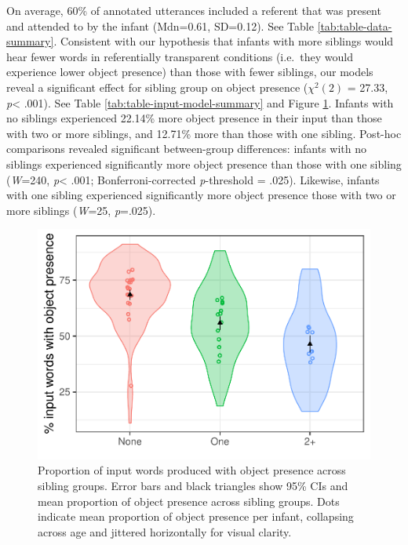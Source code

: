 \documentclass[
  man,mask,floatsintext]{apa6}
\begin{document}
On average, 60\% of annotated utterances included a referent that was present and attended to by the infant (Mdn=0.61, SD=0.12). See Table \ref{tab:table-data-summary}. Consistent with our hypothesis that infants with more siblings would hear fewer words in referentially transparent conditions (i.e.~they would experience lower object presence) than those with fewer siblings, our models reveal a significant effect for sibling group on object presence (\(\chi^2 (2)\) = 27.33, \emph{p}\textless{} .001). See Table \ref{tab:table-input-model-summary} and Figure \ref{fig:Figure-object-presence}. Infants with no siblings experienced 22.14\% more object presence in their input than those with two or more siblings, and 12.71\% more than those with one sibling. Post-hoc comparisons revealed significant between-group differences: infants with no siblings experienced significantly more object presence than those with one sibling (\emph{W}=240, \emph{p}\textless{} .001; Bonferroni-corrected \emph{p}-threshold = .025). Likewise, infants with one sibling experienced significantly more object presence those with two or more siblings (\emph{W}=25, \emph{p}=.025).

\begin{figure}
\centering
\includegraphics{SiblingsStudyText-anon-revisions_files/figure-latex/Figure-object-presence-1.pdf}
\caption{\label{fig:Figure-object-presence}Proportion of input words produced with object presence across sibling groups. Error bars and black triangles show 95\% CIs and mean proportion of object presence across sibling groups. Dots indicate mean proportion of object presence per infant, collapsing across age and jittered horizontally for visual clarity.}
\end{figure}
\end{document}
